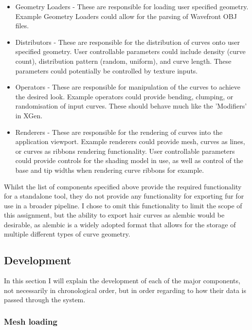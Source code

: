 \documentclass[]{acmsiggraph}
\begin{document}
\begin{itemize}
	\item Geometry Loaders - These are responsible for loading user specified geometry. Example Geometry Loaders could allow for the parsing of Wavefront OBJ files.
	\item Distributors - These are responsible for the distribution of curves onto user specified geometry. User controllable parameters could include density (curve count), distribution pattern (random, uniform), and curve length. These parameters could potentially be controlled by texture inputs.
	\item Operators - These are responsible for manipulation of the curves to achieve the desired look. Example operators could provide bending, clumping, or randomisation of input curves. These should behave much like the 'Modifiers' in XGen.
	\item Renderers - These are responsible for the rendering of curves into the application viewport. Example renderers could provide mesh, curves as lines, or curves as ribbons rendering functionality. User controllable parameters could provide controls for the shading model in use, as well as control of the base and tip widths when rendering curve ribbons for example.
\end{itemize}

Whilst the list of components specified above provide the required functionality for a standalone tool, they do not provide any functionality for exporting fur for use in a broader pipeline. I chose to omit this functionality to limit the scope of this assignment, but the ability to export hair curves as alembic would be desirable, as alembic is a widely adopted format that allows for the storage of multiple different types of curve geometry.

\subsection{Development} \label{sec:development}

In this section I will explain the development of each of the major components, not necessarily in chronological order, but in order regarding to how their data is passed through the system.

\subsubsection{Mesh loading} \label{sec:objLoading}
\end{document}
